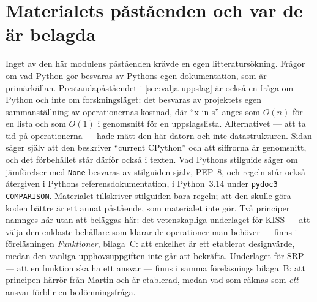 \section{Materialets påståenden och var de är belagda}
\label{sec:dicts-pastaenden}

Inget av den här modulens påståenden krävde en egen litteratursökning.
Frågor om vad Python gör besvaras av Pythons egen
dokumentation\autocite{PythonDataStructures}, som är primärkällan.
Prestandapåståendet i \cref{sec:valja-uppslag} är också en fråga om Python och
inte om forskningsläget: det besvaras av projektets egen
sammanställning av operationernas kostnad\autocite{PythonTimeComplexity},
där \enquote{x in s} anges som \(O(n)\) för en lista och som \(O(1)\) i
genomsnitt för en uppslagslista.  Alternativet --- att ta tid på
operationerna --- hade mätt den här datorn och inte datastrukturen.
Sidan säger själv att den beskriver \enquote{current CPython} och att
siffrorna är genomsnitt, och det förbehållet står därför också i texten.
Vad Pythons stilguide säger om jämförelser med \texttt{None} besvaras av
stilguiden själv, PEP~8\autocite{pep8}, och regeln står också återgiven
i Pythons referensdokumentation, i Python~3.14 under \texttt{pydoc3
COMPARISON}.
Materialet tillskriver stilguiden bara regeln; att den skulle göra
koden bättre är ett annat påstående, som materialet inte gör.
Två principer namnges här utan att beläggas här: det vetenskapliga
underlaget för \foreignlanguage{english}{KISS} --- att välja den
enklaste behållare som klarar de operationer man behöver --- finns i
föreläsningen \emph{Funktioner}, bilaga~C: att enkelhet är ett etablerat
designvärde, medan den vanliga upphovsuppgiften inte går att bekräfta.
Underlaget för \foreignlanguage{english}{SRP} --- att en funktion ska ha
ett ansvar --- finns i samma föreläsnings bilaga~B: att principen härrör
från Martin och är etablerad, medan vad som räknas som \emph{ett} ansvar
förblir en bedömningsfråga.

